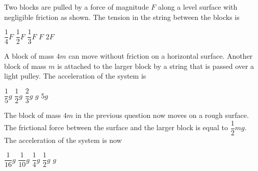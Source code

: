 \documentclass{../../../oss-ap12ibhl}
\begin{document}
\begin{questions}

  \question Two blocks are pulled by a force of magnitude $F$ along a level
  surface with negligible friction as shown. The tension in the string between
  the blocks is
  \begin{choices}
    \choice $\dfrac14F$
    \choice $\dfrac12F$
    \choice $\dfrac13F$
    \choice $F$
    \choice $2F$
  \end{choices}
  
  \question A block of mass $4m$ can move without friction on a horizontal
  surface. Another block of mass $m$ is attached to the larger block by a
  string that is passed over a light pulley. The acceleration of the system is
  \begin{choices}
    \choice $\dfrac15g$
    \choice $\dfrac12g$
    \choice $\dfrac23g$
    \choice $g$
    \choice $5g$
  \end{choices}

  \question The block of mass $4m$ in the previous question now moves on a rough
  surface. The frictional force between the surface and the larger block is
  equal to $\dfrac12mg$. The acceleration of the system is now
  \begin{choices}
    \choice $\dfrac1{16}g$
    \choice $\dfrac1{10}g$
    \choice $\dfrac1{4}g$
    \choice $\dfrac1{2}g$
    \choice $g$
  \end{choices}
    
  \newpage
  

\end{questions}
\end{document}
